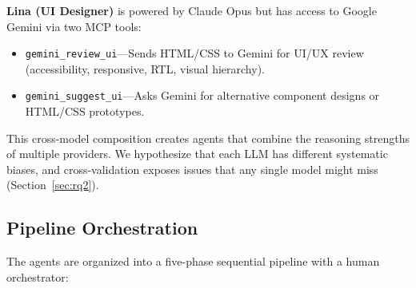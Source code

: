 \documentclass[11pt,a4paper]{article}
\begin{document}
\textbf{Lina (UI Designer)} is powered by Claude Opus but has access to Google Gemini via two MCP tools:
\begin{itemize}[leftmargin=*]
    \item \texttt{gemini\_review\_ui}---Sends HTML/CSS to Gemini for UI/UX review (accessibility, responsive, RTL, visual hierarchy).
    \item \texttt{gemini\_suggest\_ui}---Asks Gemini for alternative component designs or HTML/CSS prototypes.
\end{itemize}

This cross-model composition creates agents that combine the reasoning strengths of multiple providers. We hypothesize that each LLM has different systematic biases, and cross-validation exposes issues that any single model might miss (Section~\ref{sec:rq2}).

\subsection{Pipeline Orchestration}
\label{sec:pipeline}

The agents are organized into a five-phase sequential pipeline with a human orchestrator:
\end{document}
